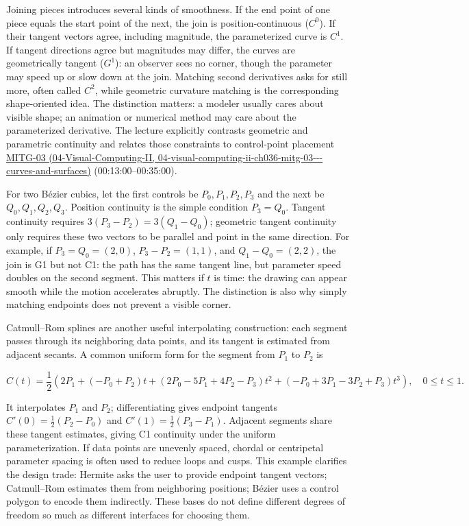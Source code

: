 Joining pieces introduces several kinds of smoothness. If the end point of one piece equals the start point of the next, the join is position-continuous (\(C^0\)). If their tangent vectors agree, including magnitude, the parameterized curve is \(C^1\). If tangent directions agree but magnitudes may differ, the curves are geometrically tangent (\(G^1\)): an observer sees no corner, though the parameter may speed up or slow down at the join. Matching second derivatives asks for still more, often called \(C^2\), while geometric curvature matching is the corresponding shape-oriented idea. The distinction matters: a modeler usually cares about visible shape; an animation or numerical method may care about the parameterized derivative. The lecture explicitly contrasts geometric and parametric continuity and relates those constraints to control-point placement \href{../04-Visual-Computing-II/main.pdf\#nameddest=04-visual-computing-ii-ch036-mitg-03---curves-and-surfaces}{MITG-03 (04-Visual-Computing-II, 04-visual-computing-ii-ch036-mitg-03-\/-\/-curves-and-surfaces)} (00:13:00--00:35:00).

For two Bézier cubics, let the first controls be \(P_0,P_1,P_2,P_3\) and the next be \(Q_0,Q_1,Q_2,Q_3\). Position continuity is the simple condition \(P_3=Q_0\). Tangent continuity requires \(3(P_3-P_2)=3(Q_1-Q_0)\); geometric tangent continuity only requires these two vectors to be parallel and point in the same direction. For example, if \(P_3=Q_0=(2,0)\), \(P_3-P_2=(1,1)\), and \(Q_1-Q_0=(2,2)\), the join is G1 but not C1: the path has the same tangent line, but parameter speed doubles on the second segment. This matters if \(t\) is time: the drawing can appear smooth while the motion accelerates abruptly. The distinction is also why simply matching endpoints does not prevent a visible corner.

Catmull--Rom splines are another useful interpolating construction: each segment passes through its neighboring data points, and its tangent is estimated from adjacent secants. A common uniform form for the segment from \(P_1\) to \(P_2\) is

\[
C(t)=\frac12\left(2P_1+(-P_0+P_2)t+(2P_0-5P_1+4P_2-P_3)t^2+(-P_0+3P_1-3P_2+P_3)t^3\right),\quad 0\le t\le1.
\]

It interpolates \(P_1\) and \(P_2\); differentiating gives endpoint tangents \(C'(0)=\frac12(P_2-P_0)\) and \(C'(1)=\frac12(P_3-P_1)\). Adjacent segments share these tangent estimates, giving C1 continuity under the uniform parameterization. If data points are unevenly spaced, chordal or centripetal parameter spacing is often used to reduce loops and cusps. This example clarifies the design trade: Hermite asks the user to provide endpoint tangent vectors; Catmull--Rom estimates them from neighboring positions; Bézier uses a control polygon to encode them indirectly. These bases do not define different degrees of freedom so much as different interfaces for choosing them.


